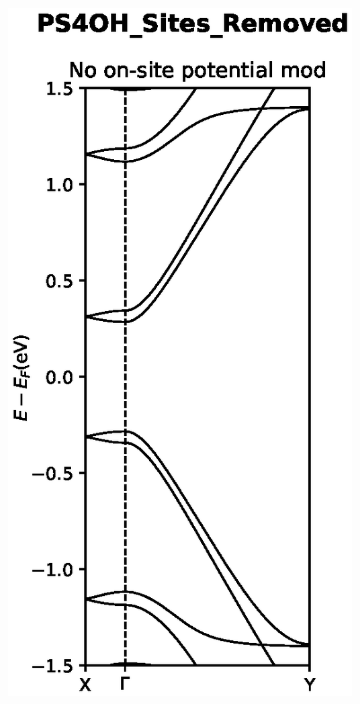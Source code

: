 \begin{figure}[h]
    \centering
    \begin{subfigure}[b]{0.25\textwidth}
    \centering
    \includegraphics[width=\textwidth]{Figures/PS4OHSitesRemoved.eps}
    \label{PS4OHremove}

\end{subfigure}
\end{figure}
